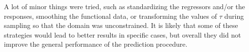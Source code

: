 A lot of minor things were tried, such as standardizing the regressors and/or the responses, smoothing the functional data, or transforming the values of \(\tau\) during sampling so that the domain was unconstrained. It is likely that some of these strategies would lead to better results in specific cases, but overall they did not improve the general performance of the prediction procedure.
